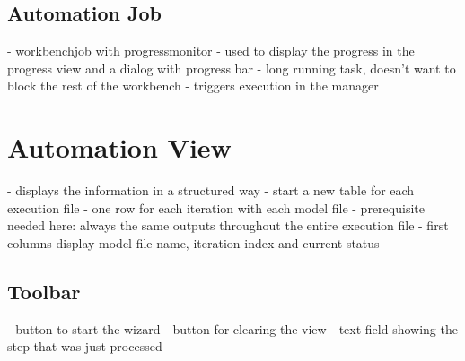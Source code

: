 \subsection{Automation Job}
- workbenchjob with progressmonitor
- used to display the progress in the progress view and a dialog with progress bar
- long running task, doesn't want to block the rest of the workbench 
- triggers execution in the manager

\section{Automation View}
- displays the information in a structured way
- start a new table for each execution file
- one row for each iteration with each model file
 - prerequisite needed here: always the same outputs throughout the entire execution file
- first columns display model file name, iteration index and current status

\subsection{Toolbar}
- button to start the wizard
- button for clearing the view
- text field showing the step that was just processed

